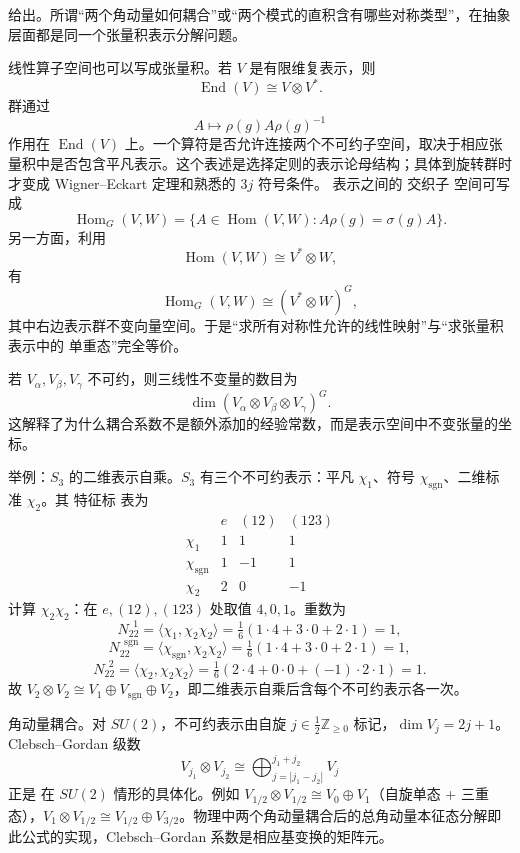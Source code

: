 给出。所谓“两个角动量如何耦合”或“两个模式的直积含有哪些对称类型”，在抽象层面都是同一个张量积表示分解问题。

线性算子空间也可以写成张量积。若 $V$ 是有限维复表示，则
\[
\operatorname{End}(V)
\cong V\otimes V^*.
\]
群通过
\[
A\longmapsto \rho(g)A\rho(g)^{-1}
\]
作用在 $\operatorname{End}(V)$ 上。一个算符是否允许连接两个不可约子空间，取决于相应张量积中是否包含平凡表示。这个表述是选择定则的表示论母结构；具体到旋转群时才变成 Wigner--Eckart 定理和熟悉的 $3j$ 符号条件。
表示之间的 交织子 空间可写成
\[
\operatorname{Hom}_G(V,W)
=
\{A\in\operatorname{Hom}(V,W):A\rho(g)=\sigma(g)A\}.
\]
另一方面，利用
\[
\operatorname{Hom}(V,W)\cong V^*\otimes W,
\]
有
\begin{equation*}\operatorname{Hom}_G(V,W)
\cong (V^*\otimes W)^G,\end{equation*}
其中右边表示群不变向量空间。于是“求所有对称性允许的线性映射”与“求张量积表示中的 单重态”完全等价。

若 $V_\alpha,V_\beta,V_\gamma$ 不可约，则三线性不变量的数目为
\[
\dim (V_\alpha\otimes V_\beta\otimes V_\gamma)^G.
\]
这解释了为什么耦合系数不是额外添加的经验常数，而是表示空间中不变张量的坐标。

举例：$S_3$ 的二维表示自乘。$S_3$ 有三个不可约表示：平凡 $\chi_1$、符号 $\chi_\mathrm{sgn}$、二维标准 $\chi_2$。其 特征标 表为
\[
\begin{array}{c|ccc}
 & e & (12) & (123)\\
\hline
\chi_1 & 1 & 1 & 1\\
\chi_\mathrm{sgn} & 1 & -1 & 1\\
\chi_2 & 2 & 0 & -1
\end{array}
\]
计算 $\chi_2\chi_2$：在 $e,(12),(123)$ 处取值 $4,0,1$。重数为
\[
N_{22}^{\ \ 1}=\langle\chi_1,\chi_2\chi_2\rangle=\tfrac16(1\cdot4+3\cdot0+2\cdot1)=1,
\]
\[
N_{22}^{\ \ \mathrm{sgn}}=\langle\chi_\mathrm{sgn},\chi_2\chi_2\rangle=\tfrac16(1\cdot4+3\cdot0+2\cdot1)=1,
\]
\[
N_{22}^{\ \ 2}=\langle\chi_2,\chi_2\chi_2\rangle=\tfrac16(2\cdot4+0\cdot0+(-1)\cdot2\cdot1)=1.
\]
故 $V_2\otimes V_2\cong V_1\oplus V_\mathrm{sgn}\oplus V_2$，即二维表示自乘后含每个不可约表示各一次。

角动量耦合。对 $SU(2)$，不可约表示由自旋 $j\in\frac12\mathbb Z_{\ge0}$ 标记，$\dim V_j=2j+1$。Clebsch--Gordan 级数
\[
V_{j_1}\otimes V_{j_2}\cong\bigoplus_{j=|j_1-j_2|}^{j_1+j_2}V_j
\]
正是 在 $SU(2)$ 情形的具体化。例如 $V_{1/2}\otimes V_{1/2}\cong V_0\oplus V_1$（自旋单态 + 三重态），$V_1\otimes V_{1/2}\cong V_{1/2}\oplus V_{3/2}$。物理中两个角动量耦合后的总角动量本征态分解即此公式的实现，Clebsch--Gordan 系数是相应基变换的矩阵元。

